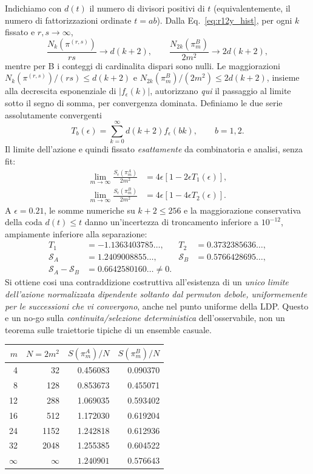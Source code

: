 \documentclass[11pt,a4paper]{article}
\begin{document}
Indichiamo con $d(t)$ il numero di divisori positivi di $t$ (equivalentemente, il numero di fattorizzazioni ordinate $t=ab$). Dalla Eq.~\eqref{eq:r12y_hist}, per ogni $k$ fissato e $r,s\to\infty$,
\begin{equation}
 \frac{N_k(\pi^{(r,s)})}{rs}\longrightarrow d(k+2),\qquad
 \frac{N_{2k}(\pi_m^B)}{2m^2}\longrightarrow2d(k+2),\label{eq:r12y_divisor_limits}
\end{equation}
mentre per B i conteggi di cardinalita dispari sono nulli. Le maggiorazioni $N_k(\pi^{(r,s)})/(rs)\le d(k+2)$ e $N_{2k}(\pi_m^B)/(2m^2)\le2d(k+2)$, insieme alla decrescita esponenziale di $|f_\epsilon(k)|$, autorizzano \emph{qui} il passaggio al limite sotto il segno di somma, per convergenza dominata. Definiamo le due serie assolutamente convergenti
\begin{equation}
 T_b(\epsilon)=\sum_{k=0}^\infty d(k+2)f_\epsilon(bk),\qquad b=1,2.\label{eq:r12y_T}
\end{equation}
Il limite dell'azione e quindi fissato \emph{esattamente} da combinatoria e analisi, senza fit:
\begin{align}
 \lim_{m\to\infty}\frac{S_\epsilon(\pi_m^A)}{2m^2}
 &=4\epsilon[1-2\epsilon T_1(\epsilon)],\\
 \lim_{m\to\infty}\frac{S_\epsilon(\pi_m^B)}{2m^2}
 &=4\epsilon[1-4\epsilon T_2(\epsilon)].\label{eq:r12y_two_limits}
\end{align}
A $\epsilon=0.21$, le somme numeriche su $k+2\le256$ e la maggiorazione conservativa della coda $d(t)\le t$ danno un'incertezza di troncamento inferiore a $10^{-12}$, ampiamente inferiore alla separazione:
\begin{align}
 T_1&=-1.1363403785\ldots,&T_2&=0.3732385636\ldots,\\
 \mathcal S_A&=1.2409008855\ldots,&\mathcal S_B&=0.5766428695\ldots,\\
 \mathcal S_A-\mathcal S_B&=0.6642580160\ldots\ne0.\label{eq:r12y_uniform_limit_values}
\end{align}
Si ottiene cosi una contraddizione costruttiva all'esistenza di un \emph{unico limite dell'azione normalizzata dipendente soltanto dal permuton debole, uniformemente per le successioni che vi convergono}, anche nel punto uniforme della LDP. Questo e un no-go sulla \emph{continuita/selezione deterministica} dell'osservabile, non un teorema sulle traiettorie tipiche di un ensemble casuale.

\begin{center}
\begin{tabular}{rrrr}
\toprule
$m$ & $N=2m^2$ & $S(\pi_m^A)/N$ & $S(\pi_m^B)/N$\\
\midrule
4&32&0.456083&0.090370\\
8&128&0.853673&0.455071\\
12&288&1.069035&0.593402\\
16&512&1.172030&0.619204\\
24&1152&1.242818&0.612936\\
32&2048&1.255385&0.604522\\
\midrule
$\infty$&$\infty$&$1.240901$&$0.576643$\\
\bottomrule
\end{tabular}
\end{center}
\end{document}
